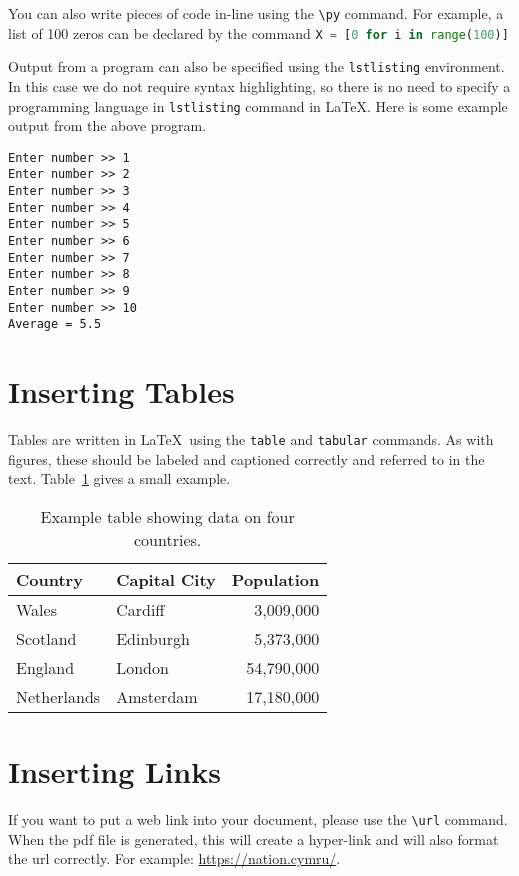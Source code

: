\documentclass[10pt]{article}
\newcommand{\py}{\lstinline[language=Python]}
\begin{document}
You can also write pieces of code in-line using the \verb|\py| command. For example, a list of 100 zeros can be declared by the command \py{X = [0 for i in range(100)]}

Output from a program can also be specified using the \texttt{lstlisting} environment. In this case we do not require syntax highlighting, so there is no need to specify a programming language in \texttt{lstlisting} command in \LaTeX. Here is some example output from the above program.

\begin{lstlisting}[frame=single]
Enter number >> 1
Enter number >> 2
Enter number >> 3
Enter number >> 4
Enter number >> 5
Enter number >> 6
Enter number >> 7
Enter number >> 8
Enter number >> 9
Enter number >> 10
Average = 5.5
\end{lstlisting}


\section{Inserting Tables}
Tables are written in \LaTeX\ using the \texttt{table} and \texttt{tabular} commands. As with figures, these should be labeled and captioned correctly and referred to in the text. Table~\ref{tab:example} gives a small example.

\begin{table}
\centering
\begin{tabular}{llr}
\hline\hline
Country		& Capital City	& Population\\
\hline
Wales		& Cardiff		& 3,009,000		\\
Scotland	& Edinburgh		& 5,373,000		\\
England		& London		& 54,790,000 	\\
Netherlands & Amsterdam & 17,180,000	\\
\hline
\end{tabular}
\caption{Example table showing data on four countries.}
\label{tab:example}
\end{table}

\section{Inserting Links}
If you want to put a web link into your document, please use the \verb|\url| command. When the pdf file is generated, this will create a hyper-link and will also format the url correctly. For example: \url{https://nation.cymru/}. 
\end{document}
